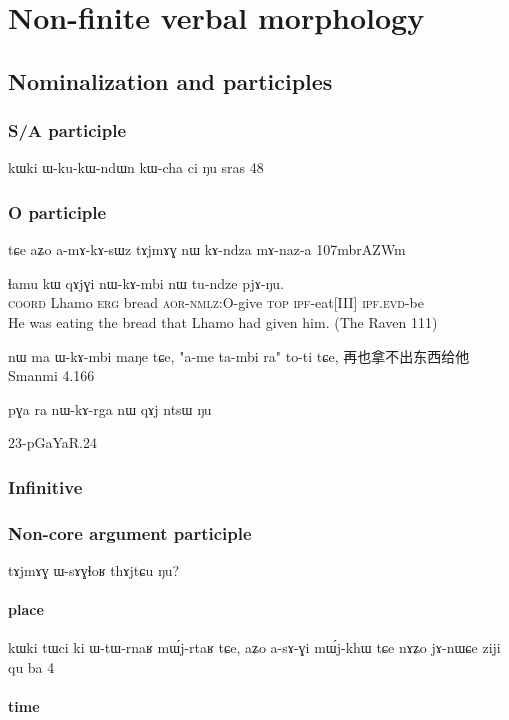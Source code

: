 \documentclass[oldfontcommands,oneside,a4paper,11pt]{memoir}
\newcommand{\ipa}[1]{{\phon #1}} %
\newcommand{\aor}{\textsc{aor}}
\newcommand{\coord}{\textsc{coord}}
\newcommand{\erg}{\textsc{erg}}
\newcommand{\evd}{\textsc{evd}}
\newcommand{\ipf}{\textsc{ipf}}
\newcommand{\nmlz}{\textsc{nmlz}}
\newcommand{\topic}{\textsc{top}}
\begin{document}
\chapter{Non-finite verbal morphology} \label{chapt:non.finite}
\section{Nominalization and participles} \label{sec:nmlz}
\subsection{S/A participle} \label{sub:S/A.part}


kɯki ɯ-ku-kɯ-ndɯn kɯ-cha ci ŋu
sras 48

\subsection{O participle} \label{sub:O.part}
tɕe aʑo a-mɤ-kɤ-sɯz tɤjmɤɣ nɯ kɤ-ndza mɤ-naz-a
107mbrAZWm

\begin{exe}
\ex
\gll      \ipa{tɕe} 	\ipa{ɬamu} 	\ipa{kɯ} 	\ipa{qɤjɣi} 	\ipa{nɯ-kɤ-mbi} 	\ipa{nɯ} 	\ipa{tu-ndze} 	\ipa{pjɤ-ŋu.}   \\
\coord{} Lhamo \erg{} bread \aor{}-\nmlz{}:O-give \topic{} \ipf{}-eat[III] \ipf.\evd{}-be  \\
 \glt    He was eating the bread that Lhamo had given him. (The Raven 111)
\end{exe} 

nɯ ma ɯ-kɤ-mbi maŋe tɕe, "a-me ta-mbi ra" to-ti tɕe, 再也拿不出东西给他
Smanmi 4.166


pɣa ra nɯ-kɤ-rga nɯ qɤj ntsɯ ŋu

23-pGaYaR.24
\subsection{Infinitive} \label{sub:infinitive}
\subsection{Non-core argument participle} \label{sub:NCA.part}

tɤjmɤɣ ɯ-sɤɣɬoʁ thɤjtɕu ŋu?
\subsubsection{place} 
kɯki tɯci ki ɯ-tɯ-rnaʁ mɯ́j-rtaʁ tɕe, aʑo a-sɤ-ɣi mɯ́j-khɯ tɕe nɤʑo jɤ-nɯɕe
ziji  qu ba 4
\subsubsection{time} 
\end{document}

